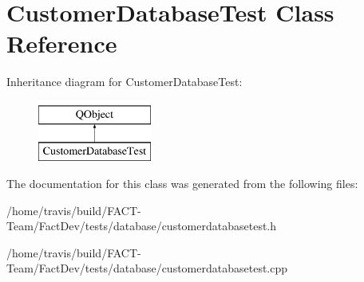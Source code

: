 \hypertarget{classCustomerDatabaseTest}{\section{Customer\-Database\-Test Class Reference}
\label{classCustomerDatabaseTest}
}
Inheritance diagram for Customer\-Database\-Test\-:\begin{figure}[H]
\begin{center}
\leavevmode
\includegraphics[height=2.000000cm]{d2/d63/classCustomerDatabaseTest}
\end{center}
\end{figure}


The documentation for this class was generated from the following files\-:\begin{DoxyCompactItemize}
\item 
/home/travis/build/\-F\-A\-C\-T-\/\-Team/\-Fact\-Dev/tests/database/customerdatabasetest.\-h\item 
/home/travis/build/\-F\-A\-C\-T-\/\-Team/\-Fact\-Dev/tests/database/customerdatabasetest.\-cpp\end{DoxyCompactItemize}
